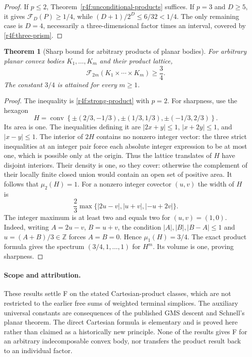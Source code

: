 \documentclass[11pt,a4paper]{article}
\newtheorem{theorem}{Theorem}[section]
\theoremstyle{remark}\newtheorem{remark}[theorem]{Remark}
\begin{document}
\begin{proof}
If $p\le2$, Theorem~\ref{r4f:unconditional-products} suffices.
If $p=3$ and $D\ge5$, it gives $\mathcal F_D(P)\ge1/4$,
while $(D+1)/2^D\le6/32<1/4$.
The only remaining case is $D=4$, necessarily a three-dimensional
factor times an interval, covered by \eqref{r4f:three-prism}.
\end{proof}

\begin{theorem}[Sharp bound for arbitrary products of planar bodies]
\label{r4f:planar-products}
For arbitrary planar convex bodies $K_1,\ldots,K_m$ and their
product lattice,
\[
 \mathcal F_{2m}(K_1\times\cdots\times K_m)\ge\frac34.
\]
The constant $3/4$ is attained for every $m\ge1$.
\end{theorem}

\begin{proof}
The inequality is \eqref{r4f:strong-product} with $p=2$.
For sharpness, use the hexagon
\[
 H=\operatorname{conv}\left\{\pm(2/3,-1/3),
               \pm(1/3,1/3),\pm(-1/3,2/3)\right\}.
\]
Its area is one. The inequalities defining it are
$|2x+y|\le1$, $|x+2y|\le1$, and $|x-y|\le1$.
The interior of $2H$ contains no nonzero integer vector: the three
strict inequalities at an integer pair force each absolute integer
expression to be at most one, which is possible only at the origin.
Thus the lattice translates of $H$ have disjoint interiors. Their
density is one, so they cover: otherwise the complement of their
locally finite closed union would contain an open set of positive area.
It follows that $\mu_2(H)=1$.
For a nonzero integer covector $(u,v)$ the width of $H$ is
\[
 \frac23\max\{|2u-v|,|u+v|,|-u+2v|\}.
\]
The integer maximum is at least two and equals two for $(u,v)=(1,0)$.
Indeed, writing $A=2u-v$, $B=u+v$, the condition
$|A|,|B|,|B-A|\le1$ and $u=(A+B)/3\in\mathbb Z$
forces $A=B=0$. Hence $\mu_1(H)=3/4$.
The exact product formula gives the spectrum
$(3/4,1,\ldots,1)$ for $H^m$. Its volume is one, proving sharpness.
\end{proof}

\paragraph{Scope and attribution.}
These results settle F on the stated Cartesian-product classes, which
are not restricted to the earlier free sums of weighted terminal
simplices. The auxiliary universal constants are consequences of the
published GMS descent and Schnell's planar theorem. The direct
Cartesian formula is elementary and is proved here rather than claimed
as a historically new principle. None of the results gives F
for an arbitrary indecomposable convex body, nor transfers the product
result back to an individual factor.
\end{document}

